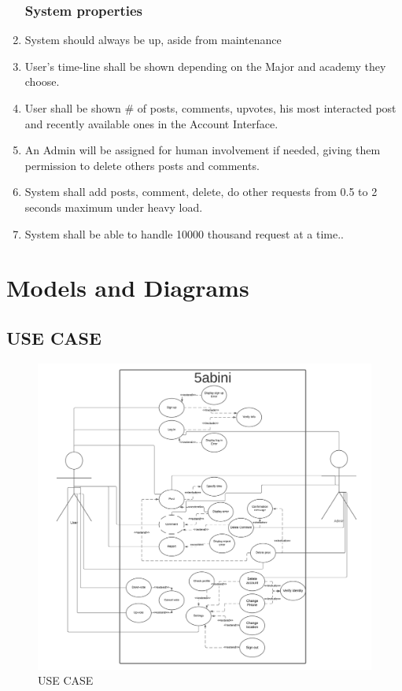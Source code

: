 \documentclass[12pt]{article}
\begin{document}
\begin{enumerate}
\subsubsection*{System properties}
\item System should always be up, aside from maintenance

\item User's time-line shall be shown depending on the Major and academy they choose.
\item User shall be shown \# of posts, comments, upvotes, his most interacted post and recently available ones in the Account Interface.
\item An Admin will be assigned for human involvement if needed, giving them permission to delete others posts and comments.
\item System shall add posts, comment, delete, do other requests from 0.5 to 2 seconds maximum under heavy load.
\item System shall be able to handle 10000 thousand request at a time..
\end{enumerate}
\sectionbreak

\section{Models and Diagrams}
\subsection{USE CASE}
\vspace{-6em}
\begin{figure}[b]
\centerline{\includegraphics[width=1.4\textwidth]{./USECASE/5abiniUseCase.png}}
\vspace{-1em}
\caption{USE CASE}
\end{figure}
\twocolumn
\end{document}
